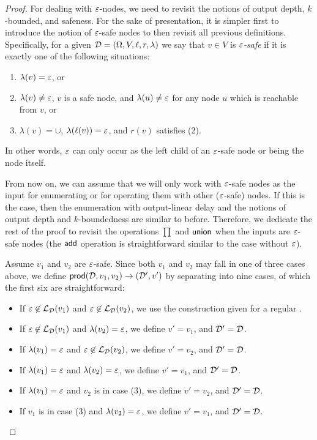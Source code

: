 \begin{proof}
For dealing with $\varepsilon$-nodes, we need to revisit the notions of output depth, $k$-bounded, and safeness. For the sake of presentation, it is simpler first to introduce the notion of $\varepsilon$-safe nodes to then revisit all previous definitions. Specifically, for a given \dsepsabbr $\mathcal{D} = (\Omega, V, \ell, r, \lambda)$ we say that $v \in V$ is \emph{$\varepsilon$-safe} if it is exactly one of the following situations:
\begin{enumerate}
	\item $\lambda(v) = \varepsilon$, or 
	\item $\lambda(v) \neq \varepsilon$, $v$ is a safe node, and  $\lambda(u) \neq \varepsilon$ for any node $u$ which is reachable from $v$, or 
	\item $\lambda(v) = \cup$, $\lambda(\ell(v)) = \varepsilon$, and $r(v)$ satisfies (2). 
\end{enumerate}
In other words, $\varepsilon$ can only occur as the left child of an $\varepsilon$-safe node or being the node itself. 

From now on, we can assume that we will only work with $\varepsilon$-safe nodes as the input for enumerating or for operating them with other ($\varepsilon$-safe) nodes. If this is the case, then the enumeration with output-linear delay and the notions of output depth and $k$-boundedness are similar to before. Therefore, we dedicate the rest of the proof to revisit the operations $\prod$ and $\mathsf{union}$ when the inputs are $\varepsilon$-safe nodes (the $\mathsf{add}$ operation is straightforward similar to the case without $\varepsilon$). 

Assume $v_1$ and $v_2$ are $\varepsilon$-safe. 
Since both $v_1$ and $v_2$ may fall in one of three cases above, we define $\mathsf{prod}(\mathcal{D},v_1,v_2) \to (\mathcal{D}',v')$ by separating into nine cases, of which the first six are straightforward: 
\begin{itemize}
	\item If $\varepsilon\not\in\mathcal{L}_{\mathcal{D}}(v_1)$ and $\varepsilon\not\in\mathcal{L}_{\mathcal{D}}(v_2)$,  we use the construction given for a regular \dsabbr.
	\item If $\varepsilon\not\in\mathcal{L}_{\mathcal{D}}(v_1)$ and $\lambda(v_2) = \varepsilon$, we define $v' = v_1$, and $\mathcal{D}' = \mathcal{D}$.
	\item If $\lambda(v_1) = \varepsilon$ and $\varepsilon\not\in\mathcal{L}_{\mathcal{D}}(v_2)$, we define $v' = v_2$, and $\mathcal{D}' = \mathcal{D}$.
	\item If $\lambda(v_1) = \varepsilon$ and $\lambda(v_2) = \varepsilon$, we define $v' = v_1$, and $\mathcal{D}' = \mathcal{D}$.
	\item If $\lambda(v_1) = \varepsilon$ and $v_2$ is in case (3), we define $v' = v_2$, and $\mathcal{D}' = \mathcal{D}$.
	\item If $v_1$ is in case (3) and $\lambda(v_2) = \varepsilon$, we define $v' = v_1$, and $\mathcal{D}' = \mathcal{D}$.
\end{itemize}


\end{proof}
